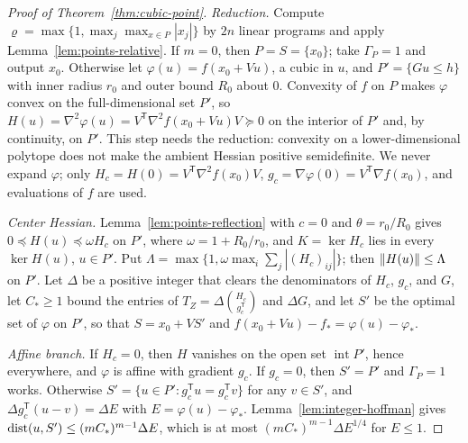 \begin{proof}[Proof of Theorem~\ref{thm:cubic-point}]
\emph{Reduction.} Compute $\varrho=\max\{1,\max_j\max_{x\in P}|x_j|\}$ by
$2n$ linear programs and apply Lemma~\ref{lem:points-relative}. If $m=0$,
then $P=S=\{x_0\}$; take $\Gamma_P=1$ and output $x_0$. Otherwise let
$\varphi(u)=f(x_0+Vu)$, a cubic in $u$, and $P'=\{Gu\le h\}$ with inner
radius $r_0$ and outer bound $R_0$ about $0$. Convexity of $f$ on $P$ makes
$\varphi$ convex on the full-dimensional set $P'$, so
$H(u)=\nabla^2\varphi(u)=V^{\mathsf T}\nabla^2f(x_0+Vu)V\succeq0$ on the
interior of $P'$ and, by continuity, on $P'$. This step needs the reduction:
convexity on a lower-dimensional polytope does not make the ambient Hessian
positive semidefinite. We never expand $\varphi$; only
$H_c=H(0)=V^{\mathsf T}\nabla^2f(x_0)V$, $g_c=\nabla\varphi(0)=V^{\mathsf
T}\nabla f(x_0)$, and evaluations of $f$ are used.

\emph{Center Hessian.} Lemma~\ref{lem:points-reflection} with $c=0$ and
$\theta=r_0/R_0$ gives $0\preceq H(u)\preceq\omega H_c$ on $P'$, where
$\omega=1+R_0/r_0$, and $K=\ker H_c$ lies in every $\ker H(u)$, $u\in P'$.
Put $\Lambda=\max\{1,\omega\max_i\sum_j|(H_c)_{ij}|\}$; then
$\left\lVert H(u)\right\rVert\le\Lambda$ on $P'$. Let $\Delta$ be a positive integer that
clears the denominators of $H_c$, $g_c$, and $G$, let
$C_*\ge1$ bound the entries of $T_Z=\Delta\binom{H_c}{g_c^{\mathsf T}}$ and
$\Delta G$, and let $S'$ be the optimal set of $\varphi$ on $P'$, so that
$S=x_0+VS'$ and $f(x_0+Vu)-f_*=\varphi(u)-\varphi_*$.

\emph{Affine branch.} If $H_c=0$, then $H$ vanishes on the open set
$\operatorname{int}P'$, hence everywhere, and $\varphi$ is affine with
gradient $g_c$. If $g_c=0$, then $S'=P'$ and $\Gamma_P=1$ works. Otherwise
$S'=\{u\in P':g_c^{\mathsf T}u=g_c^{\mathsf T}v\}$ for any $v\in S'$, and
$\Delta g_c^{\mathsf T}(u-v)=\Delta E$ with $E=\varphi(u)-\varphi_*$.
Lemma~\ref{lem:integer-hoffman} gives $\operatorname{dist}(u,S')\le(mC_*)^{m-1}\Delta E$,
which is at most $(mC_*)^{m-1}\Delta E^{1/4}$ for $E\le1$.


\end{proof}
